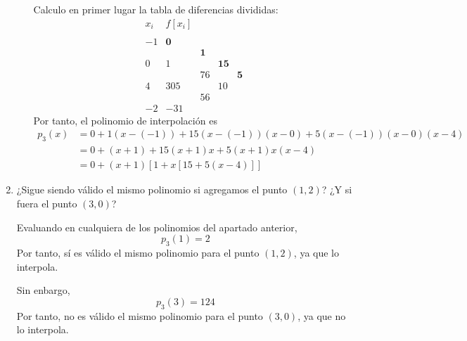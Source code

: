 \begin{ejercicio}
\begin{enumerate}
\begin{itemize}
            Calculo en primer lugar la tabla de diferencias divididas:
            \begin{equation*}
                \begin{array}{c|cccc}
                    x_i & f[x_i] \\
                    \\
                    -1 & \textbf{0} \\
                    && \textbf{1}\\
                    0 & 1 & & \textbf{15}\\
                    && 76&&\textbf{5}\\
                    4 & 305 && 10\\
                    & & 56\\
                    -2 &-31
                \end{array}
            \end{equation*}
            Por tanto, el polinomio de interpolación es
            \begin{equation*}
                \begin{split}
                    p_3(x) &= 0+1(x-(-1))+15(x-(-1))(x-0) +5(x-(-1))(x-0)(x-4) \\
                    &= 0+(x+1)+15(x+1)x + 5(x+1)x(x-4) \\
                    &= 0+(x+1)[1+x[15+5(x-4)]]
                \end{split}
            \end{equation*}
        \end{itemize}

        \item ¿Sigue siendo válido el mismo polinomio si agregamos el punto $(1, 2)$? ¿Y si fuera el punto $(3, 0)$?

        Evaluando en cualquiera de los polinomios del apartado anterior,
        \begin{equation*}
            p_3(1)=2
        \end{equation*}
        Por tanto, sí es válido el mismo polinomio para el punto $(1,2)$, ya que lo interpola.

        Sin enbargo,
        \begin{equation*}
            p_3(3)=124
        \end{equation*}
        Por tanto, no es válido el mismo polinomio para el punto $(3,0)$, ya que no lo interpola.
    \end{enumerate}
\end{ejercicio}


